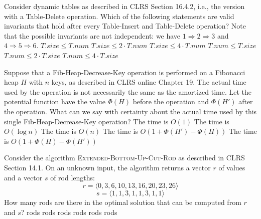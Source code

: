 \pageshift

Consider dynamic tables as described in CLRS Section 16.4.2, i.e., the version with a {\sc Table-Delete} operation.
Which of the following statements are valid invariants that hold after every {\sc Table-Insert} and {\sc Table-Delete} operation?
Note that the possible invariants are not independent: we have $1 \Rightarrow 2 \Rightarrow 3$ and $4 \Rightarrow 5 \Rightarrow 6$.
\multipleanswers
\optionsstart
\answer $T.size \leq T.num$
\answer $T.size \leq 2\cdot T.num$
\answer $T.size \leq 4\cdot T.num$ \correct
\answer $T.num \leq T.size$ \correct
\answer $T.num \leq 2\cdot T.size$ \correct
\answer $T.num \leq 4\cdot T.size$ \correct
\optionsend
{}

Suppose that a {\sc Fib-Heap-Decrease-Key} operation is performed on a Fibonacci heap $H$ with $n$ keys, as described in CLRS online Chapter 19.
The actual time used by the operation is not necessarily the same as the amortized time.
Let the potential function have the value $\Phi(H)$ before the operation and $\Phi(H')$ after the operation.
What can we say with certainty about the actual time used by this single {\sc Fib-Heap-Decrease-Key} operation?
\multipleanswers
\optionsstart
\answer The time is $O(1)$
\answer The time is $O(\log n)$
\answer The time is $O(n)$ \correct
\answer The time is $O(1 + \Phi(H') - \Phi(H))$
\answer The time is $O(1 + \Phi(H) - \Phi(H'))$ \correct
\optionsend
{}

Consider the algorithm \textsc{Extended-Bottom-Up-Cut-Rod} as described in CLRS Section 14.1.
On an unknown input, the algorithm returns a vector $r$ of values and a vector $s$ of rod lengths:
\[
r=\langle 0, 3, 6, 10, 13, 16, 20, 23, 26\rangle
\]
\[
s=\langle 1, 1, 3, 1, 1, 3, 1, 1 \rangle
\]
How many rods are there in the optimal solution that can be computed from $r$ and $s$?
\oneanswer
\optionsstart
{} rods
 rods
 rods \correct
{} rods
 rods
 rods
\optionsend
{}

